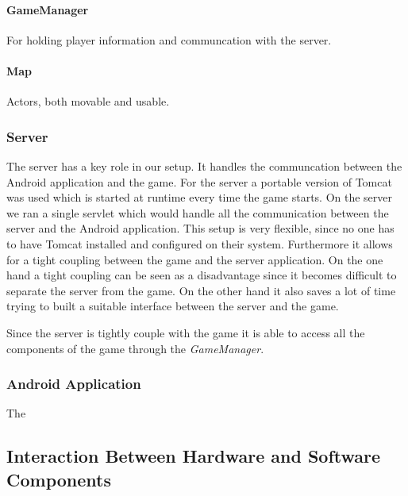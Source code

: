 \documentclass[a4paper,10pt]{article}
\begin{document}
		
		\paragraph{GameManager}
		For holding player information and communcation with the server.
		
		
		\paragraph{Map}
		Actors, both movable and usable.
		
		
		\subsubsection{Server}
		The server has a key role in our setup.
		It handles the communcation between the Android application and the game.
		For the server a portable version of Tomcat was used which is started at runtime every time the game starts.
		On the server we ran a single servlet which would handle all the communication between the server and the Android application.
		This setup is very flexible, since no one has to have Tomcat installed and configured on their system.
		Furthermore it allows for a tight coupling between the game and the server application.
		On the one hand a tight coupling can be seen as a disadvantage since it becomes difficult to separate the server from the game.
		On the other hand it also saves a lot of time trying to built a suitable interface between the server and the game.
				
		Since the server is tightly couple with the game it is able to access all the components of the game through the \emph{GameManager}.
		
		\subsubsection{Android Application}
		The 
		
	\subsection{Interaction Between Hardware and Software Components}
	
\end{document}
